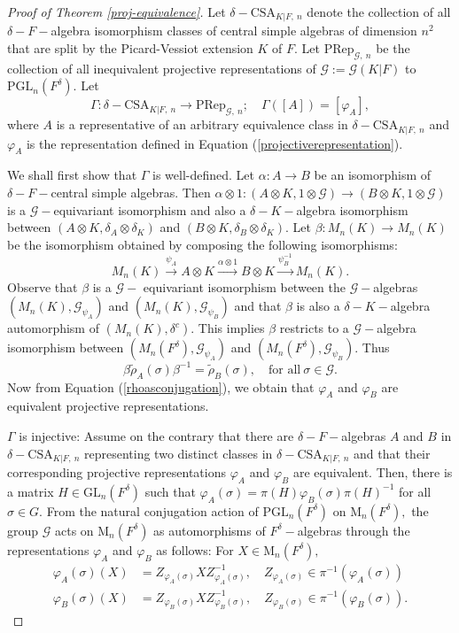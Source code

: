 \documentclass[preprint, 11pt]{amsart}
\theoremstyle{corollary}
\theoremstyle{remark}
\theoremstyle{proposition}
\numberwithin{equation}{subsection}
\begin{document}
	
\begin{proof}[Proof of Theorem \ref{proj-equivalence}]
	Let $\delta-\mathrm{CSA}_{K|F,\ n}$ denote the collection of all  $\delta-F-$algebra isomorphism classes of central simple algebras of dimension $n^2$ that are split by the Picard-Vessiot extension $K$ of $F.$ Let $\mathrm{PRep}_{\mathscr G,\ n}$ be the collection of all inequivalent projective representations of $\mathscr G:=\mathscr G(K|F)$ to $\mathrm{PGL}_n(F^\delta).$ Let $$\Gamma: \delta-\mathrm{CSA}_{K|F,\ n}\to \mathrm{PRep}_{\mathscr G,\ n}; \quad \Gamma([A])= [\varphi_A],$$ where $A$ is a representative of  an arbitrary equivalence class in $\delta-\mathrm{CSA}_{K|F,\ n}$ and $\varphi_A$ is the representation defined in  Equation (\ref{projectiverepresentation}). 
	
	We shall first show that $\Gamma$ is well-defined.  Let $\alpha: A\to B$ be an isomorphism  of $\delta-F-$central simple algebras. Then $\alpha\otimes 1: (A\otimes K, 1\otimes \mathscr G)\to (B\otimes K, 1\otimes \mathscr G)$ is a $\mathscr G-$equivariant isomorphism and also a $\delta-K-$algebra isomorphism between $(A\otimes K, \delta_A\otimes \delta_K)$ and $(B\otimes K, \delta_B\otimes \delta_K).$  Let $\beta: M_n(K)\to M_n(K)$ be the isomorphism obtained by composing the following isomorphisms: $$M_n(K)\overset{\psi_A}{\to} A\otimes K\overset{\alpha\otimes 1}{\to} B\otimes K\overset{\psi^{-1}_B}{\to}M_n(K).$$ Observe that $\beta$ is a $\mathscr G-$ equivariant isomorphism between the $\mathscr G-$algebras $(M_n(K),\mathscr{G}_{\psi_A})$ and $(M_n(K),\mathscr{G}_{\psi_B})$ and that $\beta$ is also a $\delta-K-$algebra automorphism of $(M_n(K), \delta^c).$ This implies $\beta$ restricts to a $\mathscr{G}-$algebra isomorphism between $(M_n(F^{\delta}),\mathscr{G}_{\psi_A})$ and $(M_n(F^{\delta}),\mathscr{G}_{\psi_B}).$ Thus $$\beta \tilde{\rho}_A(\sigma) \beta^{-1}=\tilde{\rho}_B(\sigma),\quad \text{for all} \ \sigma\in \mathscr G.$$ Now from Equation (\ref{rhoasconjugation}), we obtain that $\varphi_A$ and $\varphi_B$ are equivalent projective representations.
	
	
	 $\Gamma$ is injective: Assume on the contrary that there are $\delta-F-$algebras $A$ and $B$ in $\delta-\mathrm{CSA}_{K|F,\ n}$ representing two distinct classes in $\delta-\mathrm{CSA}_{K|F,\ n}$ and that their corresponding projective representations  $\varphi_A$ and $\varphi_B$ are equivalent. Then,  there is a matrix $H\in \mathrm{GL}_n(F^{\delta})$ such that $\varphi_A(\sigma)=\pi(H)\varphi_B(\sigma)\pi(H)^{-1}$ for all $\sigma \in G.$ From the natural conjugation action of $\mathrm{PGL}_n(F^{\delta})$ on $\mathrm{M}_n(F^{\delta}),$ the  group  $\mathscr G$ acts on $\mathrm{M}_n(F^{\delta})$ as automorphisms of $F^{\delta}-$algebras through the representations $\varphi_A$ and $\varphi_B$ as follows: For $X\in \mathrm{M}_n(F^{\delta}),$ \begin{align*}\varphi_A(\sigma) (X)&=Z_{\varphi_A(\sigma)} X Z^{-1}_{\varphi_A(\sigma)}, \quad Z_{\varphi_A(\sigma)}\in  \pi^{-1}(\varphi_A(\sigma))\\  \varphi_B(\sigma) (X)&=Z_{\varphi_B(\sigma)} X Z^{-1}_{\varphi_B(\sigma)},\quad Z_{\varphi_B(\sigma)} \in \pi^{-1}(\varphi_B(\sigma)).\end{align*}
	

\end{proof}
\end{document}
